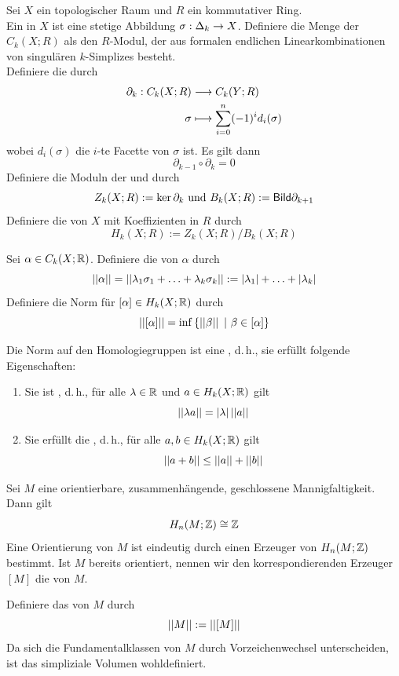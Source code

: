 \documentclass{book}
\begin{document}
Sei $X$ ein topologischer Raum und $R$ ein kommutativer Ring.\\
Ein  in $X$ ist eine stetige Abbildung $\sigma : \Delta_k \overset{}{\rightarrow} X$. Definiere die Menge der  $C_k(X; R)$ als den $R$-Modul, der aus formalen endlichen Linearkombinationen von singulären $k$-Simplizes besteht.\\
Definiere die  durch
\begin{align*}
\partial_k : C_k(X;R) & \overset{}{\longrightarrow} C_k(Y;R)\\
\sigma & \longmapsto \sum_{i = 0}^n (-1)^id_i(\sigma)
\end{align*}
wobei $d_i(\sigma)$ die $i$-te Facette von $\sigma$ ist. Es gilt dann
\[ \partial_{k-1} \circ \partial_k = 0 \]
Definiere die Moduln der  und  durch
\[ Z_k(X;R) := \ker \partial_k \text{ und } B_k(X;R) := \textsf{Bild} \partial_{k+1} \]
Definiere die  von $X$ mit Koeffizienten in $R$ durch
\[ H_k(X;R) := Z_k(X;R) / B_k(X;R) \]

\Def{}
Sei $\alpha \in C_k(X;\mathbb{R})$. Definiere die  von $\alpha$ durch
\[ \left|\left|\alpha\right|\right| = \left|\left|\lambda_1 \sigma_1 + \ldots + \lambda_k \sigma_k\right|\right| := \left|\lambda_1\right| + \ldots + \left|\lambda_k\right| \]
Definiere die Norm für $[\alpha] \in H_k(X;\mathbb{R})$ durch
\[ \norm{[\alpha]} = \inf \set{\norm{\beta}}{\beta \in [\alpha]} \]

\Prop{}
Die Norm auf den Homologiegruppen ist eine , d.\,h., sie erfüllt folgende Eigenschaften:
\begin{enumerate}[(1)]
	\item Sie ist , d.\,h., für alle $\lambda \in \mathbb{R}$ und $a \in H_k(X;\mathbb{R})$ gilt
	\[ \left|\left| \lambda a\right|\right| = \left|\lambda\right| \left|\left|a\right|\right| \]
	\item Sie erfüllt die , d.\,h., für alle $a,b \in H_k(X;\mathbb{R})$ gilt
	\[ \left|\left|a+ b\right|\right| \leq\left|\left|a\right|\right| + \left|\left|b\right|\right| \]
\end{enumerate}

\Bem{}
Sei $M$ eine orientierbare, zusammenhängende, geschlossene Mannigfaltigkeit. Dann gilt
\[ H_n(M; \mathbb{Z}) \overset{}{\cong} \mathbb{Z} \]
Eine Orientierung von $M$ ist eindeutig durch einen Erzeuger von $H_n(M; \mathbb{Z})$ bestimmt. Ist $M$ bereits orientiert, nennen wir den korrespondierenden Erzeuger $[M]$ die  von $M$.

\Def{}
Definiere das  von $M$ durch
\[ \left|\left|M\right|\right| := \left|\left|[M]\right|\right| \]
Da sich die Fundamentalklassen von $M$ durch Vorzeichenwechsel unterscheiden, ist das simpliziale Volumen wohldefiniert.
\end{document}
